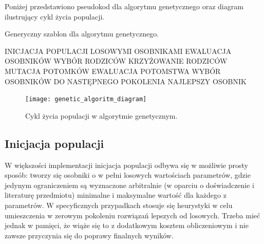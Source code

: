 \documentclass[a4paper,12pt]{article}
\numberwithin{figure}{section}
\begin{document}
    \bigskip

    \noindent
    \begin{minipage}[H]{\textwidth}
        \setlength\parindent{17pt} Poniżej przedstawiono pseudokod dla algorytmu genetycznego oraz diagram ilustrujący cykl życia populacji. \\
        \begin{algorithm}[H]
            \caption{Generyczny szablon dla algorytmu genetycznego\cite{IntroductionToEvolutionaryComputing2015}.}
            \label{alg:genetic_algorithm_template}
            \begin{algorithmic}
                \State INICJACJA POPULACJI LOSOWYMI OSOBNIKAMI
                \State EWALUACJA OSOBNIKÓW
                    \State WYBÓR RODZICÓW
                    \State KRZYŻOWANIE RODZICÓW
                    \State MUTACJA POTOMKÓW
                    \State EWALUACJA POTOMSTWA
                    \State WYBÓR OSOBNIKÓW DO NASTĘPNEGO POKOLENIA
                \EndWhile
                \State \Return NAJLEPSZY OSOBNIK
            \end{algorithmic}
        \end{algorithm}
    \end{minipage}

    \bigskip

    \begin{figure}[H]
        \centering
        \texttt{[image: genetic\_algoritm\_diagram]}
        \caption{Cykl życia populacji w algorytmie genetycznym\cite{IntroductionToEvolutionaryComputing2015}.}
        \label{fig:genetic_algoritm_diagram}
    \end{figure}

    \subsection{Inicjacja populacji}

    W większości implementacji inicjacja populacji odbywa się w możliwie prosty sposób: tworzy się osobniki o w pełni losowych wartościach parametrów, gdzie jedynym ograniczeniem są wyznaczone arbitralnie (w oparciu o doświadczenie i literaturę przedmiotu) minimalne i maksymalne wartość dla każdego z parametrów. W specyficznych przypadkach stosuje się heurystyki w celu umieszczenia w zerowym pokoleniu rozwiązań lepszych od losowych. Trzeba mieć jednak w pamięci, że wiąże się to z dodatkowym kosztem obliczeniowym i nie zawsze przyczynia się do poprawy finalnych wyników\cite{IntroductionToEvolutionaryComputing2015}.
\end{document}
